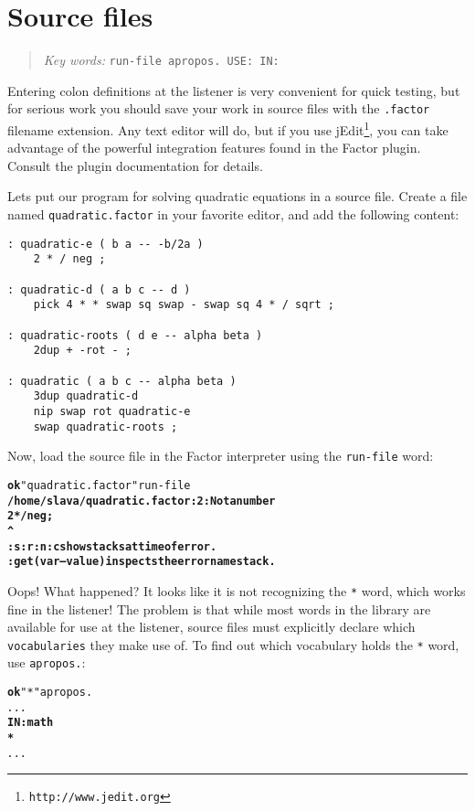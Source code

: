 \documentclass[english]{book}
\newcommand{\chapkeywords}[1]{%
\begin{quote}
\emph{Key words:} \texttt{#1}
\end{quote}
}
\begin{document}
\section{Source files}

\chapkeywords{run-file apropos.~USE: IN:}

Entering colon definitions at the listener is very convenient for quick testing, but for serious work you should save your work in source files with the \texttt{.factor} filename extension. Any text editor will do, but if you use jEdit\footnote{\texttt{http://www.jedit.org}}, you can take advantage of the powerful integration features found in the Factor plugin. Consult the plugin documentation for details.

Lets put our program for solving quadratic equations in a source file. Create a file named \texttt{quadratic.factor} in your favorite editor, and add the following content:

\begin{verbatim}
: quadratic-e ( b a -- -b/2a )
    2 * / neg ;

: quadratic-d ( a b c -- d )
    pick 4 * * swap sq swap - swap sq 4 * / sqrt ;

: quadratic-roots ( d e -- alpha beta )
    2dup + -rot - ;

: quadratic ( a b c -- alpha beta )
    3dup quadratic-d
    nip swap rot quadratic-e
    swap quadratic-roots ;
\end{verbatim}

Now, load the source file in the Factor interpreter using the \texttt{run-file} word:

\begin{alltt}
\textbf{ok} "quadratic.factor" run-file
\textbf{/home/slava/quadratic.factor:2: Not a number
    2 * / neg ;
       ^
:s :r :n :c show stacks at time of error.
:get ( var -- value ) inspects the error namestack.}
\end{alltt}

Oops! What happened? It looks like it is not recognizing the \texttt{*} word, which works fine in the listener! The problem is that while most words in the library are available for use at the listener, source files must explicitly declare which \texttt{vocabularies} they make use of. To find out which vocabulary holds the \texttt{*} word, use \texttt{apropos.}:

\begin{alltt}
\textbf{ok} "*" apropos.
\emph{...}
\textbf{IN: math
*}
\emph{...}
\end{alltt}
\end{document}
